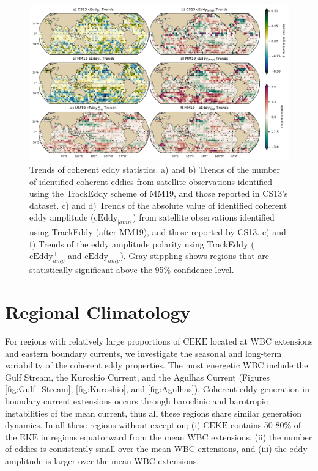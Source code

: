 \documentclass[draft,linenumbers]{agujournal2019}
\newcommand{\EKE}{\textrm{EKE}}
\newcommand{\CEKE}{\textrm{CEKE}}
\newcommand{\cEddy}{\textrm{cEddy}}
\begin{document}
	\begin{figure}
	    \centering
	    \includegraphics[width=1\textwidth]{figures/all_trackeddy_trends_all_regular.pdf}
	    \caption{Trends of coherent eddy statistics. a) and b) Trends of the number of identified coherent eddies from satellite observations identified using the TrackEddy scheme of MM19, and those reported in CS13's dataset. c) and d) Trends of the absolute value of identified coherent eddy amplitude ($\cEddy_{|amp|}$) from satellite observations identified using TrackEddy (after MM19), and those reported by CS13. e) and f) Trends of the eddy amplitude polarity using TrackEddy ($\cEddy_{amp}^+$ and $\cEddy_{amp}^-$). Gray stippling shows regions that are statistically significant above the 95\% confidence level.}
	    \label{fig:eddy_stats_trends}
	\end{figure}


	\section{Regional Climatology}
	\label{sec:CE_regional_stats}
	
	For regions with relatively large proportions of $\CEKE$ located at WBC extensions and eastern boundary currents, we investigate the seasonal and long-term variability of the coherent eddy properties. The most energetic WBC include the Gulf Stream, the Kuroshio Current, and the Agulhas Current (Figures \ref{fig:Gulf_Stream}, \ref{fig:Kuroshio}, and \ref{fig:Agulhas}). 
	Coherent eddy generation in boundary current extensions occurs through baroclinic and barotropic instabilities of the mean current, thus all these regions share similar generation dynamics. 
	In all these regions without exception; (i) $\CEKE$ contains 50-80\% of the $\EKE$ in regions equatorward from the mean WBC extensions, (ii) the number of eddies is consistently small over the mean WBC extensions, and (iii) the eddy amplitude is larger over the mean WBC extensions. 
\end{document}
